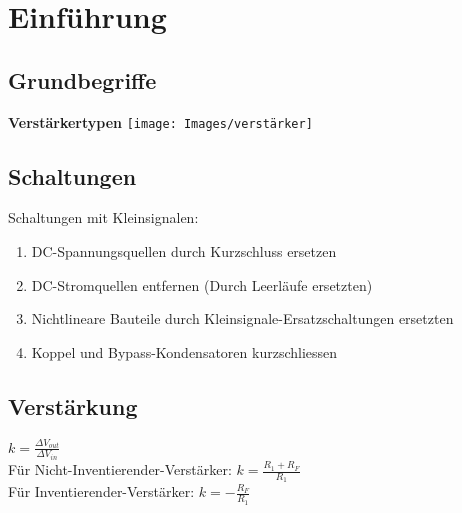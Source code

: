 \section{Einführung}
\subsection{Grundbegriffe}
\textbf{Verstärkertypen}
\texttt{[image: Images/verstärker]}

\subsection{Schaltungen}
Schaltungen mit Kleinsignalen:
\begin{enumerate}[nosep]
	\item DC-Spannungsquellen durch Kurzschluss ersetzen
	\item DC-Stromquellen entfernen (Durch Leerläufe ersetzten)
	\item Nichtlineare Bauteile durch Kleinsignale-Ersatzschaltungen ersetzten
	\item Koppel und Bypass-Kondensatoren kurzschliessen
\end{enumerate}

\subsection{Verstärkung}
$k = \frac{\Delta V_{out}}{\Delta V_{in}}$\\
Für Nicht-Inventierender-Verstärker: $k = \frac{R_1 + R_F}{R_1}$ \\
Für Inventierender-Verstärker: $k = -\frac{R_F}{R_1}$
